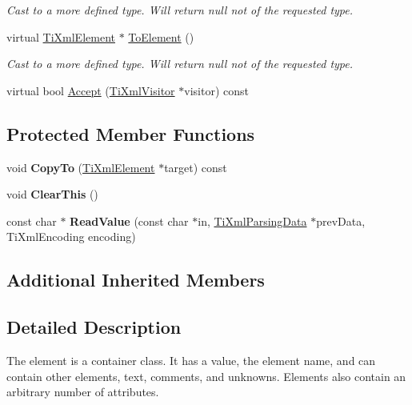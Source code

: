 \begin{DoxyCompactItemize}
\begin{DoxyCompactList}\small\item\em Cast to a more defined type. Will return null not of the requested type. \end{DoxyCompactList}\item 
\mbox{\label{classTiXmlElement_a9def86337ea7a755eb41cac980f60c7a}} 
virtual \hyperlink{classTiXmlElement}{Ti\+Xml\+Element} $\ast$ \hyperlink{classTiXmlElement_a9def86337ea7a755eb41cac980f60c7a}{To\+Element} ()
\begin{DoxyCompactList}\small\item\em Cast to a more defined type. Will return null not of the requested type. \end{DoxyCompactList}\item 
virtual bool \hyperlink{classTiXmlElement_a01d33358cce9d1817b557d314dda3779}{Accept} (\hyperlink{classTiXmlVisitor}{Ti\+Xml\+Visitor} $\ast$visitor) const
\end{DoxyCompactItemize}
\subsection*{Protected Member Functions}
\begin{DoxyCompactItemize}
\item 
\mbox{\label{classTiXmlElement_ab931f2208ed76ba03465d8a1f86b5935}} 
void {\bfseries Copy\+To} (\hyperlink{classTiXmlElement}{Ti\+Xml\+Element} $\ast$target) const
\item 
\mbox{\label{classTiXmlElement_a5670933ec2d7d9763b9891acc05d7f7d}} 
void {\bfseries Clear\+This} ()
\item 
\mbox{\label{classTiXmlElement_ac786bce103042d3837c4cc2ff6967d41}} 
const char $\ast$ {\bfseries Read\+Value} (const char $\ast$in, \hyperlink{classTiXmlParsingData}{Ti\+Xml\+Parsing\+Data} $\ast$prev\+Data, Ti\+Xml\+Encoding encoding)
\end{DoxyCompactItemize}
\subsection*{Additional Inherited Members}


\subsection{Detailed Description}
The element is a container class. It has a value, the element name, and can contain other elements, text, comments, and unknowns. Elements also contain an arbitrary number of attributes. 

